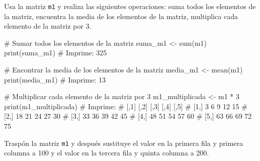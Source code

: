 \documentclass[
  letterpaper,
  DIV=11,
  numbers=noendperiod]{scrreprt}
\newenvironment{Shaded}{\begin{snugshade}}{\end{snugshade}}
\newcommand{\CommentTok}[1]{\textcolor[rgb]{0.37,0.37,0.37}{#1}}
\newcommand{\DecValTok}[1]{\textcolor[rgb]{0.68,0.00,0.00}{#1}}
\newcommand{\FunctionTok}[1]{\textcolor[rgb]{0.28,0.35,0.67}{#1}}
\newcommand{\NormalTok}[1]{\textcolor[rgb]{0.00,0.23,0.31}{#1}}
\newcommand{\OtherTok}[1]{\textcolor[rgb]{0.00,0.23,0.31}{#1}}
\newcommand{\SpecialCharTok}[1]{\textcolor[rgb]{0.37,0.37,0.37}{#1}}
\begin{document}
Usa la matriz \texttt{m1} y realiza las siguientes operaciones: suma
todos los elementos de la matriz, encuentra la media de los elementos de
la matriz, multiplica cada elemento de la matriz por 3.

\begin{Shaded}
\begin{Highlighting}[]
\CommentTok{\# Sumar todos los elementos de la matriz}
\NormalTok{suma\_m1 }\OtherTok{\textless{}{-}} \FunctionTok{sum}\NormalTok{(m1)}
\FunctionTok{print}\NormalTok{(suma\_m1)}
\CommentTok{\# Imprime: 325}

\CommentTok{\# Encontrar la media de los elementos de la matriz}
\NormalTok{media\_m1 }\OtherTok{\textless{}{-}} \FunctionTok{mean}\NormalTok{(m1)}
\FunctionTok{print}\NormalTok{(media\_m1)}
\CommentTok{\# Imprime: 13}

\CommentTok{\# Multiplicar cada elemento de la matriz por 3}
\NormalTok{m1\_multiplicada }\OtherTok{\textless{}{-}}\NormalTok{ m1 }\SpecialCharTok{*} \DecValTok{3}
\FunctionTok{print}\NormalTok{(m1\_multiplicada)}
\CommentTok{\# Imprime:}
\CommentTok{\#      [,1] [,2] [,3] [,4] [,5]}
\CommentTok{\# [1,]    3    6    9   12   15}
\CommentTok{\# [2,]   18   21   24   27   30}
\CommentTok{\# [3,]   33   36   39   42   45}
\CommentTok{\# [4,]   48   51   54   57   60}
\CommentTok{\# [5,]   63   66   69   72   75}
\end{Highlighting}
\end{Shaded}

Traspón la matriz \texttt{m1} y después sustituye el valor en la primera
fila y primera columna a 100 y el valor en la tercera fila y quinta
columna a 200.
\end{document}
